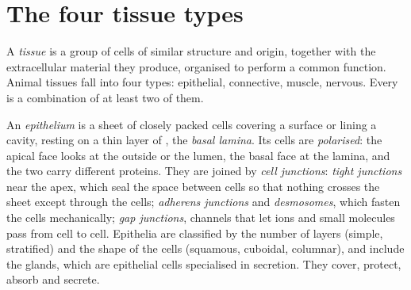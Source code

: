 \section{The four tissue types}

\begin{definition}[Tissue]\label{def:b1:body-plans-tissues:tissue}
A \emph{tissue} is a group of cells of similar structure
and origin, together with the extracellular material they produce,
organised to perform a common function. Animal tissues fall into four
types: epithelial, connective, muscle, nervous. Every  is a
combination of at least two of them.
\end{definition}

\begin{definition}\label{def:b1:body-plans-tissues:epithelium}
An \emph{epithelium} is a sheet of closely packed
cells covering a surface or lining a cavity, resting on a thin layer of
, the \emph{basal lamina}. Its
cells are \emph{polarised}: the apical face looks
at the outside or the lumen, the basal face at the lamina, and the two
carry different proteins. They are joined by \emph{cell
junctions}: \emph{tight junctions} near the apex,
which seal the space between cells so that nothing crosses the sheet
except through the cells; \emph{adherens junctions} and
\emph{desmosomes}, which fasten the cells mechanically; \emph{gap
junctions}, channels that let ions and small molecules pass from cell to
cell. Epithelia are classified by the number of layers (simple,
stratified) and the shape of the cells (squamous, cuboidal, columnar),
and include the glands, which are epithelial cells specialised in
secretion. They cover, protect, absorb and secrete.
\end{definition}

